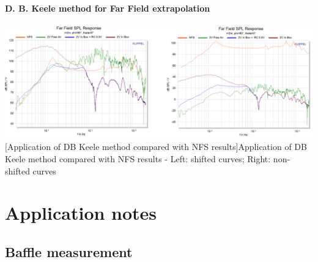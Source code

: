 \documentclass{report}
\begin{document}
\begin{appendices}
\subsubsection{D. B. Keele method for Far Field extrapolation}
\label{Curves:dbkFF}

\begin{center}
	\includegraphics[width=\textwidth]{Appendix/DKeele_FF_All} 
    \captionsetup{hypcap=false} 
	[Application of DB Keele method compared with NFS results]{Application of DB Keele method compared with NFS results - Left: shifted curves; Right: non-shifted curves} 
	\label{fig:dbk_fig}
\end{center}




\chapter{Application notes}

\section{Baffle measurement}
\label{chap:AN_Baffle}

\end{appendices}
\end{document}
